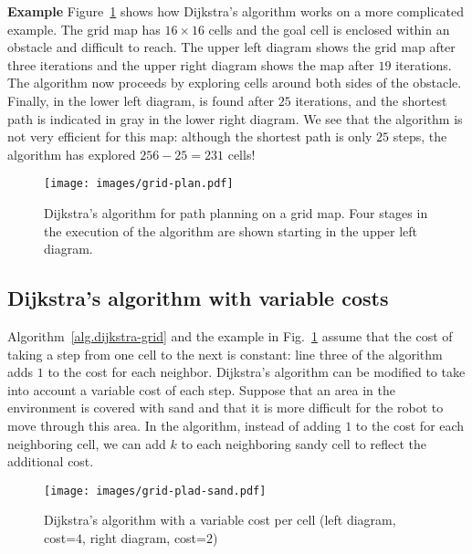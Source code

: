 \medskip

\noindent\textbf{Example} Figure~\ref{fig.dijkstra} shows how Dijkstra's algorithm works on a more complicated example. The grid map has $16\times 16$ cells and the goal cell  is enclosed within an obstacle and difficult to reach. The upper left diagram shows the grid map after three iterations and the upper right diagram shows the map after $19$ iterations. The algorithm now proceeds by exploring cells around both sides of the obstacle. Finally, in the lower left diagram,  is found after $25$ iterations, and the shortest path is indicated in gray in the lower right diagram. We see that the algorithm is not very efficient for this map: although the shortest path is only $25$ steps, the algorithm has explored $256-25=231$ cells!

\begin{figure}
\begin{center}
\texttt{[image: images/grid-plan.pdf]}
\end{center}
\caption{Dijkstra's algorithm for path planning on a grid map. Four stages in the execution of the algorithm are shown starting in the upper left diagram.}\label{fig.dijkstra}
\end{figure}

\subsection{Dijkstra's algorithm with variable costs}

Algorithm~\ref{alg.dijkstra-grid} and the example in Fig.~\ref{fig.dijkstra} assume that the cost of taking a step from one cell to the next is constant: line three of the algorithm adds $1$ to the cost for each neighbor. Dijkstra's algorithm can be modified to take into account a variable cost of each step. Suppose that an area in the environment is covered with sand and that it is more difficult for the robot to move through this area. In the algorithm, instead of adding $1$ to the cost for each neighboring cell, we can add $k$ to each neighboring sandy cell to reflect the additional cost.

\begin{figure}
\begin{center}
\texttt{[image: images/grid-plad-sand.pdf]}
\end{center}
\caption{Dijkstra's algorithm with a variable cost per cell (left diagram, cost=$4$, right diagram, cost=$2$)}\label{fig.path-sand}
\end{figure}

